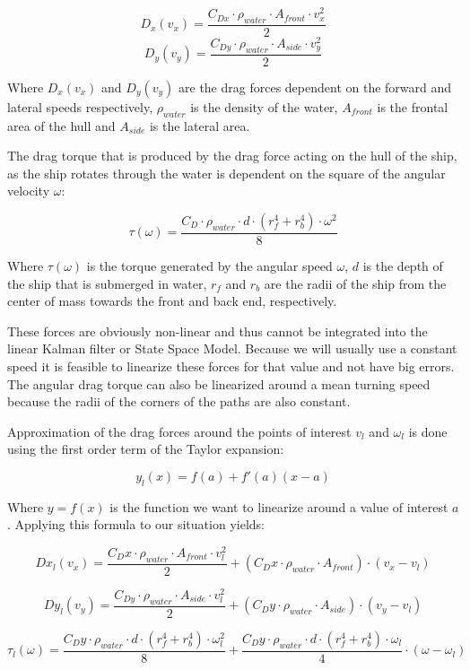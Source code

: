 \[ D_{x}(v_{x}) = \frac{C_{Dx}\cdot\rho_{water}\cdot A_{front}\cdot v_{x}^{2}}{2} \]
\[ D_{y}(v_{y}) = \frac{C_{Dy}\cdot\rho_{water}\cdot A_{side}\cdot  v_{y}^{2}}{2} \]

Where $ D_{x}(v_{x}) $ and $ D_{y}(v_{y})$ are the drag forces dependent on the forward and lateral speeds respectively, $ \rho_{water} $ is the density of the water, $ A_{front} $ is the frontal area of the hull and $ A_{side} $ is the lateral area. 

The drag torque that is produced by the drag force acting on the hull of the ship, as the ship rotates through the water is dependent on the square of the angular velocity $ \omega $:

\[ \tau(\omega) = \frac{C_{D} \cdot \rho_{water} \cdot d \cdot (r_{f}^{4} + r_{b}^{4}) \cdot \omega^{2}}{8} \]

Where $ \tau(\omega) $ is the torque generated by the angular speed $ \omega $, $ d  $ is the depth of the ship that is submerged in water, $ r_{f} $ and $ r_{b} $ are the radii of the ship from the center of mass towards the front and back end, respectively.

These forces are obviously non-linear and thus cannot be integrated into the linear Kalman filter or State Space Model. Because we will usually use a constant speed it is feasible to linearize these forces for that value and not have big errors. The angular drag torque can also be linearized around a mean turning speed because the radii of the corners of the paths are also constant.

Approximation of the drag forces around the points of interest $v_{l} $ and $\omega_{l}$ is done using the first order term of the Taylor expansion:

\[ y_{l}(x) = f(a) + f'(a)(x-a) \]

Where $y = f(x)$ is the function we want to linearize around a value of interest $a$. Applying this formula to our situation yields:

\[ Dx_{l}(v_{x}) = \frac{C_{D}x\cdot\rho_{water}\cdot A_{front}\cdot v_{l}^{2}}{2} + (C_{D}x\cdot\rho_{water}\cdot A_{front})\cdot (v_{x}-v_{l}) \]

\[ Dy_{l}(v_{y}) = \frac{C_{Dy}\cdot\rho_{water}\cdot A_{side}\cdot v_{l}^{2}}{2} + (C_{D}y\cdot\rho_{water}\cdot A_{side})\cdot (v_{y}-v_{l}) \]

\[ \tau_{l}(\omega) = \frac{C_{D}y \cdot \rho_{water} \cdot d \cdot (r_{f}^{4} + r_{b}^{4}) \cdot \omega_{l}^{2}}{8} + \frac{C_{D}y \cdot \rho_{water} \cdot d \cdot (r_{f}^{4} + r_{b}^{4}) \cdot \omega_{l}}{4} \cdot (\omega - \omega_{l}) \] 

